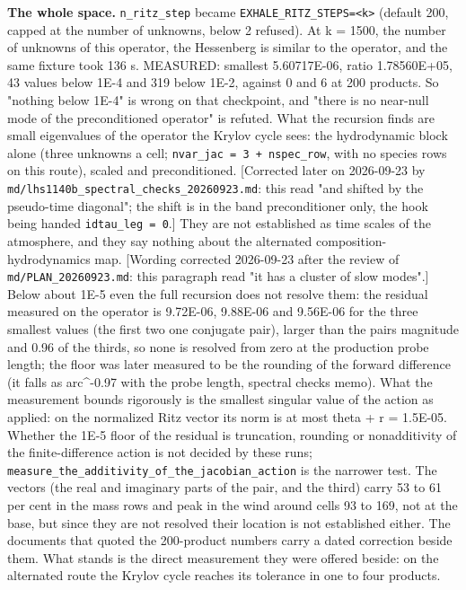 \documentclass[english,a4paper]{my_memo}
\begin{document}
\textbf{The whole space.} \texttt{n\_ritz\_step} became \texttt{EXHALE\_RITZ\_STEPS=\textless{}k\textgreater{}} (default 200,
capped at the number of unknowns, below 2 refused). At k = 1500, the number of
unknowns of this operator, the Hessenberg is similar to the operator, and the
same fixture took 136 s. MEASURED: smallest 5.60717E-06, ratio 1.78560E+05,
43 values below 1E-4 and 319 below 1E-2, against 0 and 6 at 200 products. So
"nothing below 1E-4" is wrong on that checkpoint, and "there is no near-null
mode of the preconditioned operator" is refuted. What the recursion finds are
small eigenvalues of the operator the Krylov cycle sees: the hydrodynamic block
alone (three unknowns a cell; \texttt{nvar\_jac\ =\ 3\ +\ nspec\_row}, with no species rows
on this route), scaled and preconditioned. {[}Corrected later on 2026-09-23 by
\texttt{md/lhs1140b\_spectral\_checks\_20260923.md}: this read "and shifted by the
pseudo-time diagonal"; the shift is in the band preconditioner only, the hook
being handed \texttt{idtau\_leg\ =\ 0}.{]} They are not established as time scales of the
atmosphere, and they say nothing about the alternated composition-hydrodynamics
map. {[}Wording corrected 2026-09-23 after
the review of \texttt{md/PLAN\_20260923.md}: this paragraph read "it has a cluster of
slow modes".{]} Below about 1E-5 even the full recursion does not resolve them:
the residual measured on the operator is 9.72E-06, 9.88E-06 and 9.56E-06 for
the three smallest values (the first two one conjugate pair), larger than the
pair\textquotesingle s magnitude and 0.96 of the third\textquotesingle s, so none is resolved from zero at the
production probe length; the floor was later measured to be the rounding of
the forward difference (it falls as arc\^{}-0.97 with the probe length, spectral
checks memo). What the measurement bounds rigorously is the
smallest singular value of the action as applied: on the normalized Ritz
vector its norm is at most \textbar theta\textbar{} + \textbar\textbar r\textbar\textbar{} = 1.5E-05. Whether the 1E-5 floor
of the residual is truncation, rounding or nonadditivity of the
finite-difference action is not decided by these runs;
\texttt{measure\_the\_additivity\_of\_the\_jacobian\_action} is the narrower test. The
vectors (the real and imaginary parts of the pair, and the third) carry 53 to
61 per cent in the mass rows and peak in the wind around cells 93 to 169, not
at the base, but since they are not resolved their location is not
established either. The documents that quoted the 200-product numbers carry
a dated correction beside them. What stands is the direct measurement they
were offered beside: on the alternated route the Krylov cycle reaches its
tolerance in one to four products.
\end{document}
